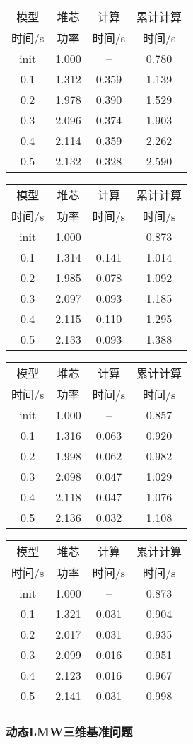 \begin{table}
{
\small
\begin{tabular}{cccc}
\toprule
模型 & 堆芯 & 计算 & 累计计算\\
时间/s & 功率 & 时间/s & 时间/s\\
\midrule
init & 1.000 & -- & 0.780\\
0.1 & 1.312 & 0.359 & 1.139\\
0.2 & 1.978 & 0.390 & 1.529\\
0.3 & 2.096 & 0.374 & 1.903\\
0.4 & 2.114 & 0.359 & 2.262\\
0.5 & 2.132 & 0.328 & 2.590\\
\bottomrule
\end{tabular}
}
{
\small
\begin{tabular}{cccc}
\toprule
模型 & 堆芯 & 计算 & 累计计算\\
时间/s & 功率 & 时间/s & 时间/s\\
\midrule
init & 1.000 & -- & 0.873\\
0.1 & 1.314 & 0.141 & 1.014\\
0.2 & 1.985 & 0.078 & 1.092\\
0.3 & 2.097 & 0.093 & 1.185\\
0.4 & 2.115 & 0.110 & 1.295\\
0.5 & 2.133 & 0.093 & 1.388\\
\bottomrule
\end{tabular}
}
{
\small
\begin{tabular}{cccc}
\toprule
模型 & 堆芯 & 计算 & 累计计算\\
时间/s & 功率 & 时间/s & 时间/s\\
\midrule
init & 1.000 & -- & 0.857\\
0.1 & 1.316 & 0.063 & 0.920\\
0.2 & 1.998 & 0.062 & 0.982\\
0.3 & 2.098 & 0.047 & 1.029\\
0.4 & 2.118 & 0.047 & 1.076\\
0.5 & 2.136 & 0.032 & 1.108\\
\bottomrule
\end{tabular}
}
{
\small
\begin{tabular}{cccc}
\toprule
模型 & 堆芯 & 计算 & 累计计算\\
时间/s & 功率 & 时间/s & 时间/s\\
\midrule
init & 1.000 & -- & 0.873\\
0.1 & 1.321 & 0.031 & 0.904\\
0.2 & 2.017 & 0.031 & 0.935\\
0.3 & 2.099 & 0.016 & 0.951\\
0.4 & 2.123 & 0.016 & 0.967\\
0.5 & 2.141 & 0.031 & 0.998\\
\bottomrule
\end{tabular}
}
\end{table}



\subsubsection{动态LMW三维基准问题}

